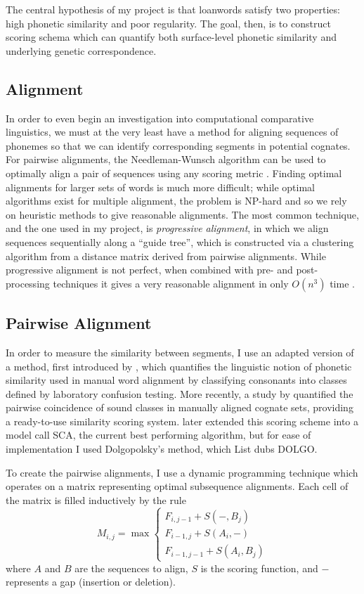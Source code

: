 \documentclass[doc,natbib]{apa6}
\begin{document}
The central hypothesis of my project is that loanwords satisfy two properties: high phonetic similarity and poor regularity. The goal, then, is to construct scoring schema which can quantify both surface-level phonetic similarity and underlying genetic correspondence.

\subsection{Alignment}

In order to even begin an investigation into computational comparative linguistics, we must at the very least have a method for aligning sequences of phonemes so that we can identify corresponding segments in potential cognates. For pairwise alignments, the Needleman-Wunsch algorithm can be used to optimally align a pair of sequences using any scoring metric \citep{Needleman1970}. Finding optimal alignments for larger sets of words is much more difficult; while optimal algorithms exist for multiple alignment, the problem is NP-hard and so we rely on heuristic methods to give reasonable alignments. The most common technique, and the one used in my project, is \emph{progressive alignment}, in which we align sequences sequentially along a ``guide tree'', which is constructed via a clustering algorithm from a distance matrix derived from pairwise alignments. While progressive alignment is not perfect, when combined with pre- and post-processing techniques it gives a very reasonable alignment in only $O(n^3)$ time \citep{Feng1987}. 

\subsection{Pairwise Alignment}

In order to measure the similarity between segments, I use an adapted version of a method, first introduced by \citet{Dolgopolsky1986}, which quantifies the linguistic notion of phonetic similarity used in manual word alignment by classifying consonants into classes defined by laboratory confusion testing. More recently, a study by \citet{Turchin2010} quantified the pairwise coincidence of sound classes in manually aligned cognate sets, providing a ready-to-use similarity scoring system. \citet{List2012a} later extended this scoring scheme into a model call SCA, the current best performing algorithm, but for ease of implementation I used Dolgopolsky's method, which List dubs DOLGO.

To create the pairwise alignments, I use a dynamic programming technique which operates on a matrix representing optimal subsequence alignments. Each cell of the matrix is filled inductively by the rule 
\begin{equation}
M_{i,j} = \max\begin{cases}
F_{i,j-1} + S(-, B_j)\\
F_{i-1,j} + S(A_i, -)\\
F_{i-1, j-1} + S(A_i, B_j)
\end{cases}
\end{equation}
where $A$ and $B$ are the sequences to align, $S$ is the scoring function, and $-$ represents a gap (insertion or deletion).
\end{document}
